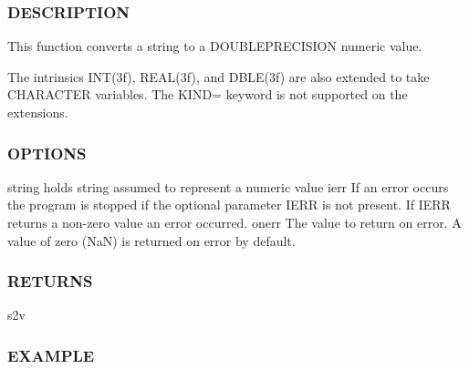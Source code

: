  \subsubsection*{D\+E\+S\+C\+R\+I\+P\+T\+I\+ON}

This function converts a string to a D\+O\+U\+B\+L\+E\+P\+R\+E\+C\+I\+S\+I\+ON numeric value.

The intrinsics I\+N\+T(3f), R\+E\+A\+L(3f), and D\+B\+L\+E(3f) are also extended to take C\+H\+A\+R\+A\+C\+T\+ER variables. The K\+I\+ND= keyword is not supported on the extensions. \subsubsection*{O\+P\+T\+I\+O\+NS}

\begin{DoxyVerb} string   holds string assumed to represent a numeric value
 ierr     If an error occurs the program is stopped if the optional
          parameter IERR is not present. If IERR returns a non-zero
          value an error occurred.
 onerr    The value to return on error. A value of zero (NaN) is
          returned on error by default.
\end{DoxyVerb}
 \subsubsection*{R\+E\+T\+U\+R\+NS}

s2v

\subsubsection*{E\+X\+A\+M\+P\+LE}

